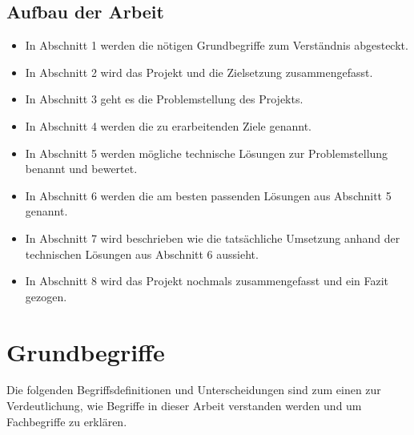 \documentclass[a4paper,11pt,singlespacing]{article}
\begin{document}
	\subsection{Aufbau der Arbeit}\label{sec:EinleitungAufbau}
		\begin{itemize}
			\item
				In Abschnitt 1 werden die nötigen Grundbegriffe zum Verständnis abgesteckt.
			\item
				In Abschnitt 2 wird das Projekt und die Zielsetzung zusammengefasst.
			\item
				In Abschnitt 3 geht es die Problemstellung des Projekts.
			\item
				In Abschnitt 4 werden die zu erarbeitenden Ziele genannt.
			\item
				In Abschnitt 5 werden mögliche technische Lösungen zur Problemstellung benannt und bewertet.
			\item
				In Abschnitt 6 werden die am besten passenden Lösungen aus Abschnitt 5 genannt.
			\item
				In Abschnitt 7 wird beschrieben wie die tatsächliche Umsetzung anhand der technischen Lösungen aus Abschnitt 6 aussieht.
			\item
				In Abschnitt 8 wird das Projekt nochmals zusammengefasst und ein Fazit gezogen.
		\end{itemize}

\newpage

\section{Grundbegriffe}\label{sec:Grundbegriffe}
	Die folgenden Begriffsdefinitionen und Unterscheidungen sind zum einen zur Verdeutlichung, wie Begriffe in dieser Arbeit verstanden werden und um Fachbegriffe zu erklären.
	
\end{document}
